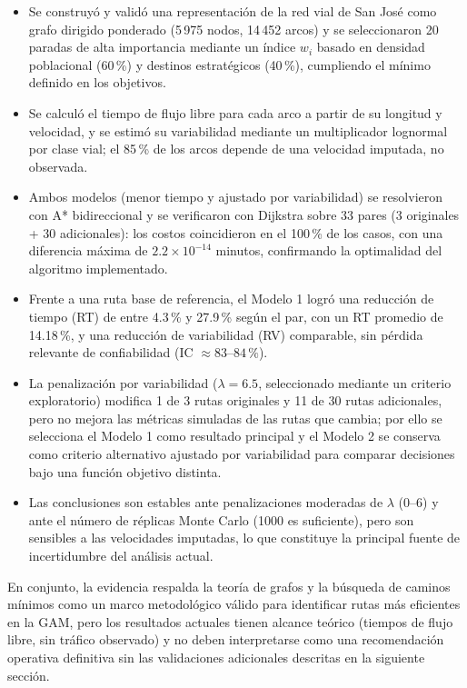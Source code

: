 \documentclass[11pt]{article}
\numberwithin{equation}{section}
\begin{document}
\begin{itemize}
    \item Se construyó y validó una representación de la red vial de San José como grafo dirigido ponderado (5\,975 nodos, 14\,452 arcos) y se seleccionaron 20 paradas de alta importancia mediante un índice $w_i$ basado en densidad poblacional (60\,\%) y destinos estratégicos (40\,\%), cumpliendo el mínimo definido en los objetivos.
    \item Se calculó el tiempo de flujo libre para cada arco a partir de su longitud y velocidad, y se estimó su variabilidad mediante un multiplicador lognormal por clase vial; el 85\,\% de los arcos depende de una velocidad imputada, no observada.
    \item Ambos modelos (menor tiempo y ajustado por variabilidad) se resolvieron con A* bidireccional y se verificaron con Dijkstra sobre 33 pares (3 originales + 30 adicionales): los costos coincidieron en el 100\,\% de los casos, con una diferencia máxima de $2.2\times 10^{-14}$ minutos, confirmando la optimalidad del algoritmo implementado.
    \item Frente a una ruta base de referencia, el Modelo 1 logró una reducción de tiempo (RT) de entre 4.3\,\% y 27.9\,\% según el par, con un RT promedio de 14.18\,\%, y una reducción de variabilidad (RV) comparable, sin pérdida relevante de confiabilidad (IC $\approx 83$--$84\,\%$).
    \item La penalización por variabilidad ($\lambda=6.5$, seleccionado mediante un criterio exploratorio) modifica 1 de 3 rutas originales y 11 de 30 rutas adicionales, pero no mejora las métricas simuladas de las rutas que cambia; por ello se selecciona el Modelo 1 como resultado principal y el Modelo 2 se conserva como criterio alternativo ajustado por variabilidad para comparar decisiones bajo una función objetivo distinta.
    \item Las conclusiones son estables ante penalizaciones moderadas de $\lambda$ (0--6) y ante el número de réplicas Monte Carlo (1000 es suficiente), pero son sensibles a las velocidades imputadas, lo que constituye la principal fuente de incertidumbre del análisis actual.
\end{itemize}

En conjunto, la evidencia respalda la teoría de grafos y la búsqueda de caminos mínimos como un marco metodológico válido para identificar rutas más eficientes en la GAM, pero los resultados actuales tienen alcance teórico (tiempos de flujo libre, sin tráfico observado) y no deben interpretarse como una recomendación operativa definitiva sin las validaciones adicionales descritas en la siguiente sección.
\end{document}
